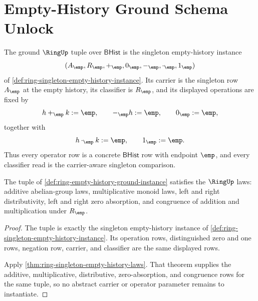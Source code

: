 \section{Empty-History Ground Schema Unlock}
\label{sec:ring-empty-history-ground-schema-unlock}

\begin{definition}
\label{def:ring-empty-history-ground-instance}
The ground $\RingUp$ tuple over $\mathsf{BHist}$ is the singleton
empty-history instance
$$
(A_{\emp},R_{\emp},+_{\emp},0_{\emp},-_{\emp},\cdot_{\emp},1_{\emp})
$$
of \autoref{def:ring-singleton-empty-history-instance}. Its carrier is the
singleton row $A_{\emp}$ at the empty history, its classifier is
$R_{\emp}$, and its displayed operations are fixed by
$$
h+_{\emp}k:=\emp,\qquad
-_{\emp}h:=\emp,\qquad
0_{\emp}:=\emp,
$$
together with
$$
h\cdot_{\emp}k:=\emp,\qquad
1_{\emp}:=\emp.
$$
Thus every operator row is a concrete $\mathsf{BHist}$ row with endpoint
$\emp$, and every classifier read is the carrier-aware singleton comparison.
\end{definition}

\begin{theorem}
\label{thm:ring-empty-history-ground-laws}
The tuple of \autoref{def:ring-empty-history-ground-instance} satisfies the
$\RingUp$ laws: additive abelian-group laws, multiplicative monoid laws,
left and right distributivity, left and right zero absorption, and
congruence of addition and multiplication under $R_{\emp}$.
\end{theorem}
\begin{proof}
The tuple is exactly the singleton empty-history instance of
\autoref{def:ring-singleton-empty-history-instance}. Its operation rows,
distinguished zero and one rows, negation row, carrier, and classifier are
the same displayed rows.

Apply \autoref{thm:ring-singleton-empty-history-laws}. That theorem supplies
the additive, multiplicative, distributive, zero-absorption, and congruence
rows for the same tuple, so no abstract carrier or operator parameter remains
to instantiate.
\end{proof}


